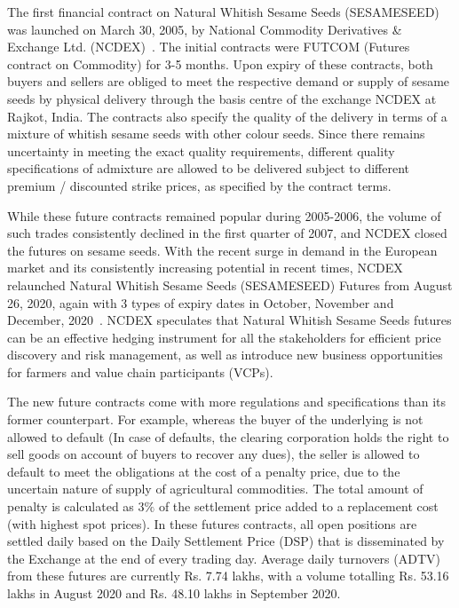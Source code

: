 \documentclass[12pt]{report}
\begin{document}
The first financial contract on Natural Whitish Sesame Seeds (SESAMESEED) was launched on March 30, 2005, by National Commodity Derivatives \& Exchange Ltd. (NCDEX)~\cite{ncdex-circular1}. The initial contracts were FUTCOM (Futures contract on Commodity) for 3-5 months. Upon expiry of these contracts, both buyers and sellers are obliged to meet the respective demand or supply of sesame seeds by physical delivery through the basis centre of the exchange NCDEX at Rajkot, India. The contracts also specify the quality of the delivery in terms of a mixture of whitish sesame seeds with other colour seeds. Since there remains uncertainty in meeting the exact quality requirements, different quality specifications of admixture are allowed to be delivered subject to different premium / discounted strike prices, as specified by the contract terms. 

While these future contracts remained popular during 2005-2006, the volume of such trades consistently declined in the first quarter of 2007, and NCDEX closed the futures on sesame seeds. With the recent surge in demand in the European market and its consistently increasing potential in recent times, NCDEX relaunched Natural Whitish Sesame Seeds (SESAMESEED) Futures from August 26, 2020, again with 3 types of expiry dates in October, November and December, 2020~\cite{ncdex-circular2, eco-times}. NCDEX speculates that Natural Whitish Sesame Seeds futures can be an effective hedging instrument for all the stakeholders for efficient price discovery and risk management, as well as introduce new business opportunities for farmers and value chain participants (VCPs).

The new future contracts come with more regulations and specifications than its former counterpart. For example, whereas the buyer of the underlying is not allowed to default (In case of defaults, the clearing corporation holds the right to sell goods on account of buyers to recover any dues), the seller is allowed to default to meet the obligations at the cost of a penalty price, due to the uncertain nature of supply of agricultural commodities. The total amount of penalty is calculated as $3\%$ of the settlement price added to a replacement cost (with highest spot prices). In these futures contracts, all open positions are settled daily based on the Daily Settlement Price (DSP) that is disseminated by the Exchange at the end of every trading day. Average daily turnovers (ADTV) from these futures are currently Rs. 7.74 lakhs, with a volume totalling Rs. 53.16 lakhs in August 2020 and Rs. 48.10 lakhs in September 2020. 
 
\end{document}
